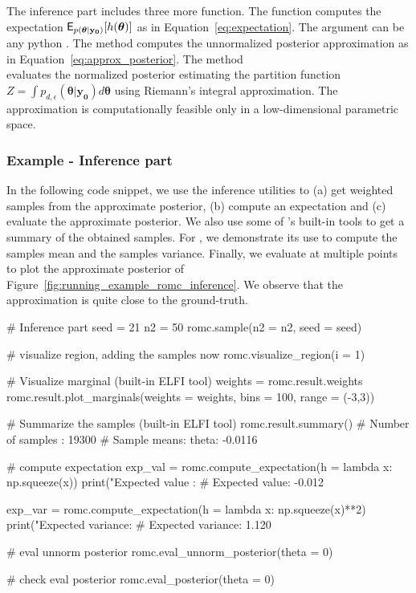 \documentclass[article, shortnames]{jss}
\newcommand{\thetab}{\boldsymbol{\theta}}
\newcommand{\data}{\mathbf{y_0}}
\begin{document}
\noindent
The inference part includes three more function. The function
 computes the expectation
\(\E_{p(\thetab|\data)}[h(\thetab)]\) as in
Equation~\ref{eq:expectation}. The argument  can be any python
. The method  computes the unnormalized posterior
approximation as in Equation~\ref{eq:approx_posterior}. The method \\
 evaluates the
normalized posterior estimating the partition function
\(Z = \int p_{d,\epsilon}(\thetab|\data)d\thetab\) using Riemann's
integral approximation. The approximation is computationally feasible
only in a low-dimensional parametric space.

\subsubsection*{Example - Inference part}

In the following code snippet, we use the inference utilities to (a)
get weighted samples from the approximate posterior, (b) compute an
expectation and (c) evaluate the approximate posterior. We also use
some of 's built-in tools to get a summary of the obtained
samples. For , we demonstrate its use
to compute the samples mean and the samples variance. Finally, we
evaluate  at multiple points to plot the
approximate posterior of
Figure~\ref{fig:running_example_romc_inference}. We observe that the
approximation is quite close to the ground-truth.

\begin{Code}
# Inference part
seed = 21
n2 = 50
romc.sample(n2 = n2, seed = seed)

# visualize region, adding the samples now
romc.visualize_region(i = 1)

# Visualize marginal (built-in ELFI tool)
weights = romc.result.weights
romc.result.plot_marginals(weights = weights, bins = 100, range = (-3,3))

# Summarize the samples (built-in ELFI tool)
romc.result.summary()
# Number of samples  : 19300
# Sample means: theta: -0.0116

# compute expectation
exp_val = romc.compute_expectation(h = lambda x: np.squeeze(x))
print("Expected value   : %
# Expected value: -0.012

exp_var = romc.compute_expectation(h = lambda x: np.squeeze(x)**2)
print("Expected variance: %
# Expected variance: 1.120

# eval unnorm posterior
romc.eval_unnorm_posterior(theta = 0)

# check eval posterior
romc.eval_posterior(theta = 0)
\end{Code}
\end{document}
